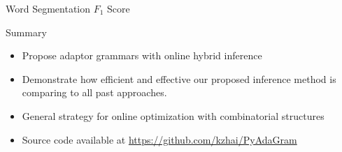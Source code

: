 \begin{frame}{Word Segmentation $F_1$ Score}
\end{frame}

\begin{frame}{Summary}
  \begin{itemize}
  \item Propose adaptor grammars with online hybrid inference\\
  \item Demonstrate how efficient and effective our proposed inference
    method is comparing to all past approaches.
    \item General strategy for online optimization with combinatorial structures
  \item Source code available at \url{https://github.com/kzhai/PyAdaGram}
  \end{itemize}
\end{frame}

